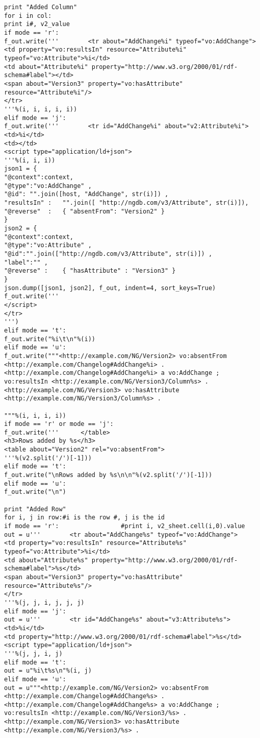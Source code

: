 \begin{verbatim}
print "Added Column"
for i in col:
print i#, v2_value
if mode == 'r':
f_out.write('''        <tr about="AddChange%i" typeof="vo:AddChange">
<td property="vo:resultsIn" resource="Attribute%i" typeof="vo:Attribute">%i</td>
<td about="Attribute%i" property="http://www.w3.org/2000/01/rdf-schema#label"></td>
<span about="Version3" property="vo:hasAttribute" resource="Attribute%i"/>
</tr>
'''%(i, i, i, i, i))
elif mode == 'j':
f_out.write('''        <tr id="AddChange%i" about="v2:Attribute%i">
<td>%i</td>
<td></td>
<script type="application/ld+json">
'''%(i, i, i))
json1 = {
"@context":context,
"@type":"vo:AddChange" ,
"@id": "".join([host, "AddChange", str(i)]) ,
"resultsIn" :   "".join([ "http://ngdb.com/v3/Attribute", str(i)]),
"@reverse"  :   { "absentFrom": "Version2" }
}
json2 = {
"@context":context,
"@type":"vo:Attribute" ,
"@id":"".join(["http://ngdb.com/v3/Attribute", str(i)]) ,
"label":"" ,
"@reverse" :    { "hasAttribute" : "Version3" }
}
json.dump([json1, json2], f_out, indent=4, sort_keys=True)
f_out.write('''
</script>
</tr>
''')
elif mode == 't':
f_out.write("%i\t\n"%(i))	
elif mode == 'u':
f_out.write("""<http://example.com/NG/Version2> vo:absentFrom <http://example.com/Changelog#AddChange%i> .
<http://example.com/Changelog#AddChange%i> a vo:AddChange ;
vo:resultsIn <http://example.com/NG/Version3/Column%s> .
<http://example.com/NG/Version3> vo:hasAttribute <http://example.com/NG/Version3/Column%s> .

"""%(i, i, i, i))
if mode == 'r' or mode == 'j':
f_out.write('''      </table>
<h3>Rows added by %s</h3>
<table about="Version2" rel="vo:absentFrom">
'''%(v2.split('/')[-1]))
elif mode == 't':
f_out.write("\nRows added by %s\n\n"%(v2.split('/')[-1]))
elif mode == 'u':
f_out.write("\n")

print "Added Row"
for i, j in row:#i is the row #, j is the id
if mode == 'r':	                #print i, v2_sheet.cell(i,0).value
out = u'''        <tr about="AddChange%s" typeof="vo:AddChange">
<td property="vo:resultsIn" resource="Attribute%s" typeof="vo:Attribute">%i</td>
<td about="Attribute%s" property="http://www.w3.org/2000/01/rdf-schema#label">%s</td>
<span about="Version3" property="vo:hasAttribute" resource="Attribute%s"/>
</tr>
'''%(j, j, i, j, j, j)
elif mode == 'j':
out = u'''        <tr id="AddChange%s" about="v3:Attribute%s">
<td>%i</td>
<td property="http://www.w3.org/2000/01/rdf-schema#label">%s</td>
<script type="application/ld+json">
'''%(j, j, i, j)
elif mode == 't':
out = u"%i\t%s\n"%(i, j)
elif mode == 'u':
out = u"""<http://example.com/NG/Version2> vo:absentFrom <http://example.com/Changelog#AddChange%s> .
<http://example.com/Changelog#AddChange%s> a vo:AddChange ;
vo:resultsIn <http://example.com/NG/Version3/%s> .
<http://example.com/NG/Version3> vo:hasAttribute <http://example.com/NG/Version3/%s> .


\end{verbatim}
